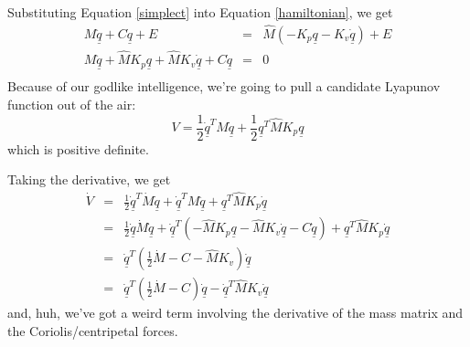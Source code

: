 \documentclass[]{article}
\begin{document}
Substituting Equation \ref{simplect} into Equation \ref{hamiltonian}, we get
\begin{eqnarray}
 M\ddot{\underline{q}} + C\dot{\underline{q}} + E & = & \hat{M}\left(-K_{p}\underline{q} - K_{v}\dot{\underline{q}}\right) + E \nonumber \\
 M\underline{\ddot{q}} + \hat{M}K_{p}\underline{q} + \hat{M}K_{v}\dot{\underline{q}} + C\dot{\underline{q}} & = & 0 \nonumber \\
\end{eqnarray}
Because of our godlike intelligence, we're going to pull a candidate Lyapunov function out of the air:
\begin{displaymath}
 V = \frac{1}{2}\dot{\underline{q}}^{T}M\underline{\dot{q}} + \frac{1}{2}\underline{q}^{T}\hat{M}K_{p}\underline{q}
\end{displaymath}
which is positive definite.



Taking the derivative, we get
\begin{eqnarray}
 \dot{V} & = & \frac{1}{2}\dot{\underline{q}}^{T}\dot{M}\dot{\underline{q}} + \underline{\dot{q}}^{T}M\underline{\ddot{q}} + \underline{q}^{T}\hat{M}K_{p}\dot{\underline{q}} \nonumber \\
 & = & \frac{1}{2}\underline{\dot{q}}\dot{M}\underline{\dot{q}} + \dot{\underline{q}}^{T}\left( -\hat{M}K_{p}\underline{q} - \hat{M}K_{v}\dot{\underline{q}}-C\dot{\underline{q}}\right) + \underline{q}^{T}\hat{M}K_{p}\dot{\underline{q}} \nonumber \\& = & \dot{\underline{q}}^{T}\left(\frac{1}{2}\dot{M} - C - \hat{M}K_{v}\right)\dot{\underline{q}} \nonumber \\
 & = & \dot{\underline{q}}^{T}\left( \frac{1}{2}\dot{M} - C\right)\dot{\underline{q}} - \dot{\underline{q}}^{T}\hat{M}K_{v}\dot{\underline{q}} \label{lyap1}
\end{eqnarray}
and, huh, we've got a weird term involving the derivative of the mass matrix and the Coriolis/centripetal forces. 
\end{document}
